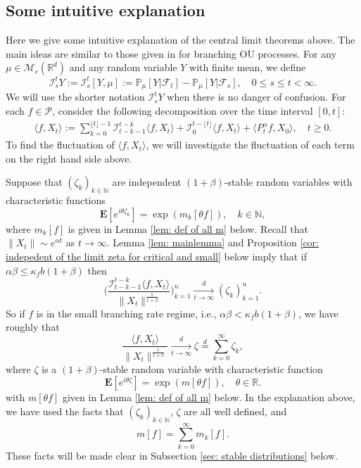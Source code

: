 \documentclass[12pt,a4paper]{amsart}
\theoremstyle{plain}
\theoremstyle{definition}
\numberwithin{equation}{section}
\begin{document}
\subsection{Some intuitive explanation}
Here we give some intuitive explanation of the central limit theorems above.
    The main ideas
    are similar to those given in \cite{MarksMilos2018CLT} for branching OU processes.
For any $\mu\in  \mathcal M_c(\mathbb R^d)$ and any random variable $Y$ with finite mean, we define
\begin{equation}\label{Ist}
    \mathcal I_s^t Y:=\mathcal I_s^t [Y, \mu]
    := \mathbb P_\mu[Y|\mathscr F_t] - \mathbb P_\mu[Y|\mathscr F_s],\quad 0 \leq s \leq t <\infty.
\end{equation}
    We will use the shorter notation $\mathcal I_s^t Y$ when there is no danger of confusion.
    For each $f\in \mathcal{P}$, consider the following decomposition over the time interval $[0,t]$:
\begin{align}
       \langle f,X_t\rangle
        :=\sum_{k=0}^{\lfloor t \rfloor-1} \mathcal I_{t-k-1}^{t-k}\langle f ,X_t\rangle+\mathcal I_0^{t-\lfloor t \rfloor}\langle f ,X_t\rangle +
         \langle P^\alpha_tf,X_0\rangle,
               \quad t\geq 0.
\end{align}
   To find the fluctuation of $\langle f,X_t\rangle$, we will investigate the fluctuation of
   each term on the right hand side above.

    Suppose that $(\zeta_k)_{k \in \mathbb N}$ are independent $(1+\beta)$-stable random variables with characteristic functions
\[
     \mathbf E[e^{i\theta \zeta_k}] = \exp( m_k[\theta f]),\quad k \in \mathbb N,
\]
    where $m_k[f]$ is given in Lemma \ref{lem: def of all m} below.
    Recall that $\|X_t\|\sim e^{\alpha t}$ as $t\to\infty$.
    Lemma \ref{lem: mainlemma} and 
   Proposition \ref{cor: indepedent of the limit zeta for critical and small} below  
    imply that if $\alpha\beta \leq \kappa_f b(1+\beta) $ then
\[
    \bigg(\frac{\mathcal I^{t-k}_{t-k-1}\langle f,X_t\rangle}{\|X_t\|^{\frac{1}{1+\beta}}}\bigg)_{k=1}^n
    \xrightarrow [t\to \infty]{d} (\zeta_k)_{k=1}^n.
\]
    So if $f$ is in the small branching rate regime, i.e., $\alpha \beta < \kappa_f b(1+\beta)$, we have roughly that
\[
     \frac{\langle f,X_t\rangle}{\|X_t\|^{\frac{1}{1+\beta}}} \xrightarrow[t\to \infty]{d} \zeta\overset{d}{=}\sum_{k=0}^\infty \zeta_k,
\]
	where $\zeta$ is a $(1+\beta)$-stable random variable with characteristic function
\[
    \mathbf E[e^{i\theta \zeta}] = \exp(m[\theta f]),\quad \theta \in \mathbb R.
\]
    with $m[\theta f]$ given in Lemma \ref{lem: def of all m} below.
	In the explanation above, we have used the facts that 
    $(\zeta_k)_{k\in \mathbb N}$, $\zeta$ are all well defined, and
\begin{equation}
\label{eq: equatlity for mf for small rate}
    m[f] =  \sum_{k=0}^\infty m_k[ f].
\end{equation}
    These facts will be made clear in Subsection \ref{sec: stable distributions} below.
\end{document}
